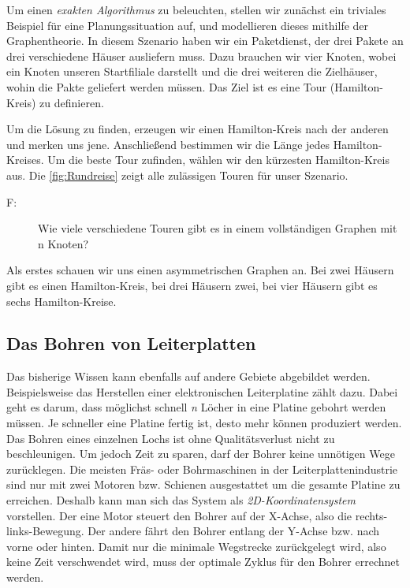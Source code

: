 \documentclass{article}
\begin{document}
Um einen \textit{exakten Algorithmus} zu beleuchten, stellen wir zunächst ein triviales Beispiel für eine Planungssituation auf, und modellieren dieses mithilfe der Graphentheorie. In diesem Szenario haben wir ein Paketdienst, der drei Pakete an drei verschiedene Häuser ausliefern muss. Dazu brauchen wir vier Knoten, wobei ein Knoten unseren Startfiliale darstellt und die drei weiteren die Zielhäuser, wohin die Pakte geliefert werden müssen. Das Ziel ist es eine Tour (Hamilton-Kreis) zu definieren.
\par Um die Lösung zu finden, erzeugen wir einen Hamilton-Kreis nach der anderen und merken uns jene. Anschließend bestimmen wir die Länge jedes Hamilton-Kreises. Um die beste Tour zufinden, wählen wir den kürzesten Hamilton-Kreis aus. Die \autoref{fig:Rundreise} zeigt alle zulässigen Touren für unser Szenario.

\begin{description}
	\item[F:] Wie viele verschiedene Touren gibt es in einem vollständigen Graphen mit n Knoten?
\end{description}

Als erstes schauen wir uns einen asymmetrischen Graphen an. Bei zwei Häusern gibt es einen Hamilton-Kreis, bei drei Häusern zwei, bei vier Häusern gibt es sechs Hamilton-Kreise.


\subsection{Das Bohren von Leiterplatten}

Das bisherige Wissen kann ebenfalls auf andere Gebiete abgebildet werden. Beispielsweise das Herstellen einer elektronischen Leiterplatine zählt dazu. Dabei geht es darum, dass möglichst schnell \textit{n} Löcher in eine Platine gebohrt werden müssen. Je schneller eine Platine fertig ist, desto mehr können produziert werden. Das Bohren eines einzelnen Lochs ist ohne Qualitätsverlust nicht zu beschleunigen. Um jedoch Zeit zu sparen, darf der Bohrer keine unnötigen Wege zurücklegen. Die meisten Fräs- oder Bohrmaschinen in der Leiterplattenindustrie sind nur mit zwei Motoren bzw. Schienen ausgestattet um die gesamte Platine zu erreichen. Deshalb kann man sich das System als \textit{2D-Koordinatensystem} vorstellen. Der eine Motor steuert den Bohrer auf der X-Achse, also die rechts-links-Bewegung. Der andere fährt den Bohrer entlang der Y-Achse bzw. nach vorne oder hinten. Damit nur die minimale Wegstrecke zurückgelegt wird, also keine Zeit verschwendet wird, muss der optimale Zyklus für den Bohrer errechnet werden.
\end{document}
